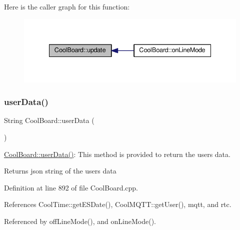 Here is the caller graph for this function\+:\nopagebreak
\begin{figure}[H]
\begin{center}
\leavevmode
\includegraphics[width=335pt]{classCoolBoard_a8612756d3f73198cdde857a66f0fe690_icgraph}
\end{center}
\end{figure}
\mbox{\label{classCoolBoard_ae7358fb6e623cfc81b775f5f1734909b}} 
\subsubsection{\texorpdfstring{user\+Data()}{userData()}}
{\footnotesize\ttfamily String Cool\+Board\+::user\+Data (\begin{DoxyParamCaption}{ }\end{DoxyParamCaption})}

\hyperlink{classCoolBoard_ae7358fb6e623cfc81b775f5f1734909b}{Cool\+Board\+::user\+Data()}\+: This method is provided to return the user\textquotesingle{}s data.

\begin{DoxyReturn}{Returns}
json string of the user\textquotesingle{}s data 
\end{DoxyReturn}


Definition at line 892 of file Cool\+Board.\+cpp.



References Cool\+Time\+::get\+E\+S\+Date(), Cool\+M\+Q\+T\+T\+::get\+User(), mqtt, and rtc.



Referenced by off\+Line\+Mode(), and on\+Line\+Mode().



